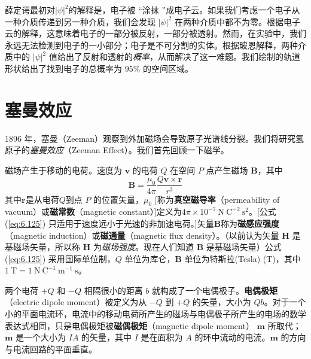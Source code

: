     薛定谔最初对$\left|\psi\right|^2$的解释是，电子被 “涂抹 ”成电子云。如果我们考虑一个电子从一种介质传递到另一种介质，我们会发现 $\left|\psi\right|^2$ 在两种介质中都不为零。根据电子云的解释，这意味着电子的一部分被反射，一部分被透射。然而，在实验中，我们永远无法检测到电子的一小部分；电子是不可分割的实体。根据玻恩解释，两种介质中的 $\left|\psi\right|^2$ 值给出了反射和透射的\textit{概率}，从而解决了这一难题。我们绘制的轨道形状给出了找到电子的总概率为 $95\%$ 的空间区域。

\section{塞曼效应}
\label{sec:6.8 Zeeman effect}
    1896 年，塞曼（Zeeman）观察到外加磁场会导致原子光谱线分裂。我们将研究氢原子的\textit{塞曼效应}（Zeeman Effect）。我们首先回顾一下磁学。

    磁场产生于移动的电荷。速度为 $\mathbf{v}$ 的电荷 $Q$ 在空间 $P$ 点产生磁场 $\mathbf{B}$，其中
    \begin{equation}
        \mathbf{B} = \frac{\mu_0}{4\pi}\frac{Q\mathbf{v}\times\mathbf{r}}{r^3}
        \label{eq:6.125}
    \end{equation}
    其中$\mathbf{r}$是从电荷$Q$到点 $P$ 的位置矢量，$\mu_0$ [称为\textbf{真空磁导率}（permeability of vacuum）或\textbf{磁常数}（magnetic constant）]定义为$4\pi\times 10^{-7}\:\mathrm{N} \:\mathrm{C}^{-2}\: \mathrm{s}^{2}$。[公式 (\ref{eq:6.125}) 只适用于速度远小于光速的非加速电荷。]矢量$\mathbf{B}$称为\textbf{磁感应强度}（magnetic induction）或\textbf{磁通量}（magnetic flux density）。（以前认为矢量 $\mathbf{H}$ 是基磁场矢量，所以称 $\mathbf{H}$ 为\textit{磁场强度}。现在人们知道 $\mathbf{B}$ 是基磁场矢量）公式 (\ref{eq:6.125}) 采用国际单位制，$Q$ 单位为库仑，$\mathbf{B}$ 单位为特斯拉(Tesla) (T)，其中$1\:\mathrm{T} = 1\:\mathrm{N}\:\mathrm{C}^{-1}\:\mathrm{m}^{-1} \: \mathrm{s}$。

    两个电荷 $+Q$ 和 $-Q$ 相隔很小的距离 $b$ 就构成了一个电偶极子。\textbf{电偶极矩}（electric dipole moment）被定义为从 $-Q$ 到 $+Q$ 的矢量，大小为 $Qb$。对于一个小的平面电流环，电流中的移动电荷所产生的磁场与电偶极子所产生的电场的数学表达式相同，只是电偶极矩被\textbf{磁偶极矩}（magnetic dipole moment） $\mathbf{m}$ 所取代；$\mathbf{m}$ 是一个大小为 $IA$ 的矢量，其中 $I$ 是在面积为 $A$ 的环中流动的电流。$\mathbf{m}$ 的方向与电流回路的平面垂直。

